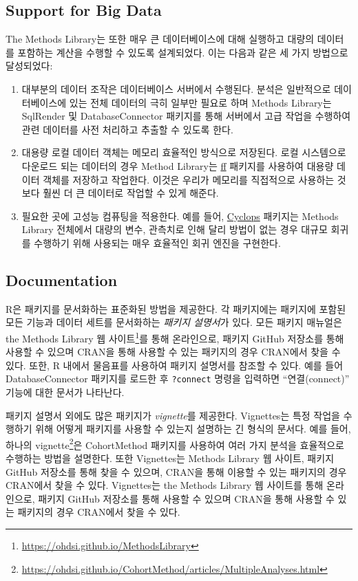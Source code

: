 \documentclass[11pt]{book}
\providecommand{\tightlist}{%
  \setlength{\itemsep}{0pt}\setlength{\parskip}{0pt}}
\let\rmarkdownfootnote\footnote%
\def\footnote{\protect\rmarkdownfootnote}
\theoremstyle{definition}
\theoremstyle{definition}
\theoremstyle{definition}
\theoremstyle{remark}
\begin{document}
\subsection{Support for Big Data}\label{BigDataSupport}

The Methods Library는 또한 매우 큰 데이터베이스에 대해 실행하고 대량의
데이터를 포함하는 계산을 수행할 수 있도록 설계되었다. 이는 다음과 같은
세 가지 방법으로 달성되었다:

\begin{enumerate}
\def\labelenumi{\arabic{enumi}.}
\tightlist
\item
  대부분의 데이터 조작은 데이터베이스 서버에서 수행된다. 분석은
  일반적으로 데이터베이스에 있는 전체 데이터의 극히 일부만 필요로 하며
  Methods Library는 SqlRender 및 DatabaseConnector 패키지를 통해
  서버에서 고급 작업을 수행하여 관련 데이터를 사전 처리하고 추출할 수
  있도록 한다.
\item
  대용량 로컬 데이터 객체는 메모리 효율적인 방식으로 저장된다. 로컬
  시스템으로 다운로드 되는 데이터의 경우 Method Library는
  \href{https://cran.r-project.org/web/packages/ff}{ff} 패키지를
  사용하여 대용량 데이터 객체를 저장하고 작업한다. 이것은 우리가
  메모리를 직접적으로 사용하는 것보다 훨씬 더 큰 데이터로 작업할 수 있게
  해준다.
\item
  필요한 곳에 고성능 컴퓨팅을 적용한다. 예를 들어,
  \href{https://ohdsi.github.io/Cyclops/}{Cyclops} 패키지는 Methods
  Library 전체에서 대량의 변수, 관측치로 인해 달리 방법이 없는 경우
  대규모 회귀를 수행하기 위해 사용되는 매우 효율적인 회귀 엔진을
  구현한다.
\end{enumerate}

\subsection{Documentation}\label{documentation-1}

R은 패키지를 문서화하는 표준화된 방법을 제공한다. 각 패키지에는 패키지에
포함된 모든 기능과 데이터 세트를 문서화하는 \emph{패키지 설명서}가 있다.
모든 패키지 매뉴얼은 the Methods Library 웹 사이트\footnote{\url{https://ohdsi.github.io/MethodsLibrary}}를
통해 온라인으로, 패키지 GitHub 저장소를 통해 사용할 수 있으며 CRAN을
통해 사용할 수 있는 패키지의 경우 CRAN에서 찾을 수 있다. 또한, R 내에서
물음표를 사용하여 패키지 설명서를 참조할 수 있다. 예를 들어
DatabaseConnector 패키지를 로드한 후 \texttt{?connect} 명령을 입력하면
``연결(connect)'' 기능에 대한 문서가 나타난다.

패키지 설명서 외에도 많은 패키지가 \emph{vignette}를 제공한다.
Vignettes는 특정 작업을 수행하기 위해 어떻게 패키지를 사용할 수 있는지
설명하는 긴 형식의 문서다. 예를 들어, 하나의 vignette\footnote{\url{https://ohdsi.github.io/CohortMethod/articles/MultipleAnalyses.html}}은
CohortMethod 패키지를 사용하여 여러 가지 분석을 효율적으로 수행하는
방법을 설명한다. 또한 Vignettes는 Methods Library 웹 사이트, 패키지
GitHub 저장소를 통해 찾을 수 있으며, CRAN을 통해 이용할 수 있는 패키지의
경우 CRAN에서 찾을 수 있다. Vignettes는 the Methods Library 웹 사이트를
통해 온라인으로, 패키지 GitHub 저장소를 통해 사용할 수 있으며 CRAN을
통해 사용할 수 있는 패키지의 경우 CRAN에서 찾을 수 있다.
\end{document}

